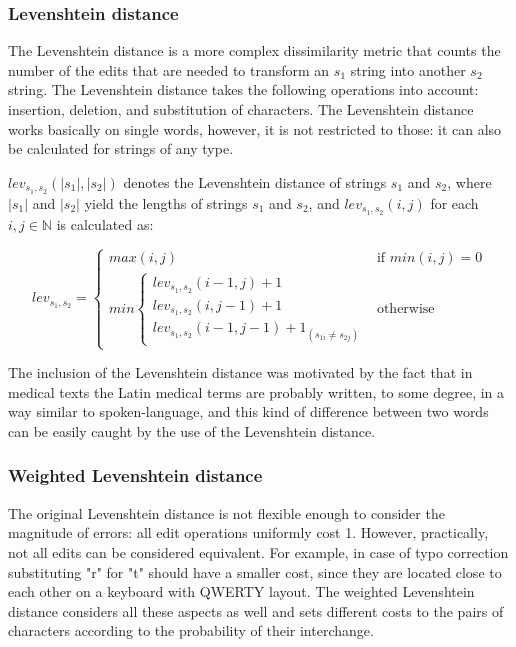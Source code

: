 \subsubsection*{Levenshtein distance}

The Levenshtein distance \cite{miller2009levenshtein, piskorski2007string} is a more complex dissimilarity metric that counts the number of the edits that are needed to transform an $s_1$ string into another $s_2$ string. The Levenshtein distance takes the following operations into account: insertion, deletion, and substitution of characters. The Levenshtein distance works basically on single words, however, it is not restricted to those: it can also be calculated for strings of any type.

$lev_{s_1,s_2}(|s_1|,|s_2|)$ denotes the Levenshtein distance of strings $s_1$ and $s_2$, where $|s_1|$ and $|s_2|$ yield the lengths of strings $s_1$ and $s_2$, and $lev_{s_1,s_2}(i,j)$ for each $i,j \in \mathbb{N}$ is calculated as:

\begin{equation}
	lev_{s_1,s_2}=
	\begin{cases}
		max(i,j) & \text{if } min(i,j)=0 \\
		min \begin{cases}
		lev_{s_1,s_2}(i-1,j)+1  \\
		lev_{s_1,s_2}(i,j-1)+1  \\
		lev_{s_1,s_2}(i-1,j-1)+1_{(s_{1i} \neq s_{2j})} 
	\end{cases} & \text{otherwise}
	\end{cases}
	\label{eq:levenshtein}
\end{equation}

The inclusion of the Levenshtein distance was motivated by the fact that in medical texts the Latin medical terms are probably written, to some degree, in a way similar to spoken-language, and this kind of difference between two words can be easily caught by the use of the Levenshtein distance.

\subsubsection*{Weighted Levenshtein distance}

The original Levenshtein distance is not flexible enough to consider the magnitude of errors: all edit operations uniformly cost 1. However, practically, not all edits can be considered equivalent. For example, in case of typo correction substituting "r" for "t" should have a smaller cost, since they are located close to each other on a keyboard with QWERTY layout. The weighted Levenshtein distance considers all these aspects as well and sets different costs to the pairs of characters according to the probability of their interchange.

